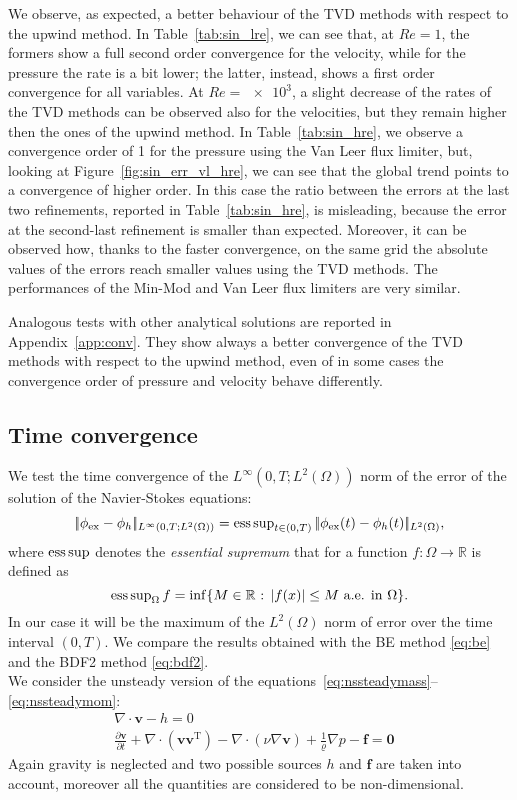 We observe, as expected, a better behaviour of the TVD methods with respect to 
the upwind method. In Table~\ref{tab:sin_lre}, we can see that, at $Re=1$, the 
formers show a full second order convergence for the velocity, while for the pressure the
rate is a bit lower; the latter, instead, shows a first order convergence for 
all variables. At 
$Re=\num{e3}$, a slight decrease of the rates of the TVD methods can be observed also 
for 
the velocities, but they remain higher then the ones of the upwind method. In 
Table~\ref{tab:sin_hre}, we observe a convergence order of 1 for the pressure 
using the Van Leer flux limiter, but, looking at 
Figure~\ref{fig:sin_err_vl_hre}, we can 
see that the global trend points to a convergence of higher order.
In this case the ratio between the errors at the last two refinements, reported in Table~\ref{tab:sin_hre}, is misleading, because the error at the second-last refinement is smaller than expected.
Moreover, it can be observed how, thanks to the faster convergence, on the same grid the 
absolute values of the errors reach smaller values using the TVD methods.
The performances of the Min-Mod and Van Leer flux limiters are very similar.

Analogous tests with other analytical solutions are reported in 
Appendix~\ref{app:conv}. They show always a better convergence of the TVD 
methods with respect to the upwind method, even of in some cases the convergence 
order of pressure and velocity behave differently.
%
\subsection{Time convergence}
We test the time convergence of the $L^\infty(0,T;L^2(\Omega))$ norm of the 
error of the solution of the Navier-Stokes equations:
\begin{equation}
	|\!|\phi_\text{ex}-\phi_h|\!|_{L^\infty(0,T;L^2(\Omega))} = \operatorname{ess\,sup}_{t \in 
	(0,T)} |\!|\phi_\text{ex}(t) - \phi_h(t) |\!|_{L^2(\Omega)}, 
\end{equation}
where $\operatorname{ess\,sup}$ denotes the \emph{essential supremum} that for a function 
$f:\Omega\rightarrow\mathbb{R}$ is defined as
\begin{equation}
	\operatorname{ess\,sup}_\Omega f = \inf \{\text{$M \in \mathbb{R}$ : $ |f(x)| \leq 
	M$ a.e. in $\Omega$} \}.
\end{equation}
In our case it will be the maximum of the $L^2(\Omega)$ norm of error over the 
time interval $(0,T)$. We compare the results 
obtained with the BE method \eqref{eq:be} and the BDF2 method \eqref{eq:bdf2}.\\
We consider the unsteady version of the 
equations~\eqref{eq:nssteadymass}--\eqref{eq:nssteadymom}:
\begin{align}
	\label{eq:nsunsteadymass} \nabla \cdot \mathbf{v} -h = 0&\\
	\label{eq:nsunsteadymom} \frac{\partial \mathbf{v}}{\partial t} +\nabla 
	\cdot (\mathbf{v} \mathbf{v}^\mathrm{T}) - 
	\nabla \cdot (\nu \nabla \mathbf{v}) + \frac{1}{\varrho}\nabla p  
	-\mathbf{f} = \mathbf{0}&
\end{align}
Again gravity is neglected and two possible sources $h$ and $\mathbf{f}$ 
are taken into account, moreover all the quantities are considered to be 
non-dimensional.
%

